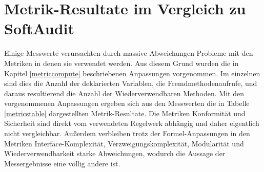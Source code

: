 \documentclass[gb,ngerman]{stthesis}
\begin{document}
  		\section{Metrik-Resultate im Vergleich zu SoftAudit}
  			Einige Messwerte verursachten durch massive Abweichungen Probleme mit den Metriken in denen sie verwendet werden. Aus diesem Grund wurden die in Kapitel \ref{metriccompute} beschriebenen Anpassungen vorgenommen. Im einzelnen sind dies die Anzahl der deklarierten Variablen, die Fremdmethodenaufrufe, und daraus resultierend die Anzahl der Wiederverwendbaren Methoden. \newline
  			Mit den vorgenommenen Anpassungen ergeben sich aus den Messwerten die in Tabelle \ref{metricstable} dargestellten Metrik-Resultate. Die Metriken Konformität und Sicherheit sind direkt vom verwendeten Regelwerk abhängig und daher eigentlich nicht vergleichbar. Außerdem verbleiben trotz der Formel-Anpassungen in den Metriken Interface-Komplexität, Verzweigungskomplexität, Modularität  und Wiederverwendbarkeit starke Abweichungen, wodurch die Aussage der Messergebnisse eine völlig andere ist. \newline
\end{document}

